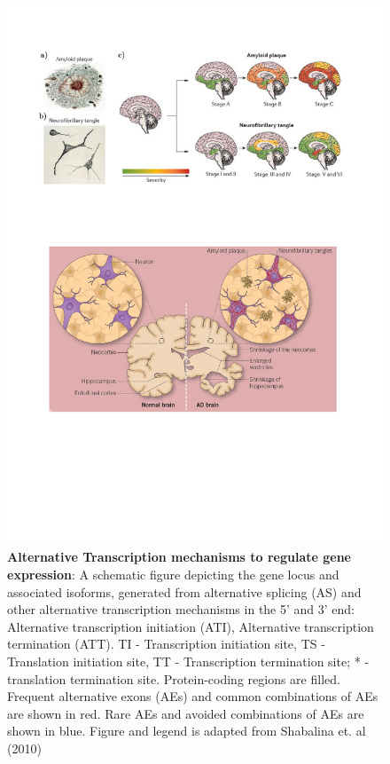 \begin{figure}[!h]
	\centering
	\includegraphics[page=14,trim={0 15cm 2cmcm 0},clip, scale = 0.7]{Figures/Introduction_Figures.pdf}
	\captionsetup{width=0.95\textwidth,singlelinecheck=off}
	\caption[Alternative transcription coupled with Alternative Splicing Mechanisms]%
	{\textbf{Alternative Transcription mechanisms to regulate gene expression}: A schematic figure depicting the gene locus and associated isoforms, generated from alternative splicing (AS) and other alternative transcription mechanisms in the 5' and 3' end: Alternative transcription initiation (ATI), Alternative transcription termination (ATT). \newline
	TI - Transcription initiation site, TS - Translation initiation site, TT - Transcription termination site; * - translation termination site. Protein-coding regions are filled. Frequent alternative exons (AEs) and common combinations of AEs are shown in red. Rare AEs and avoided combinations of AEs are shown in blue. Figure and legend is adapted from Shabalina et. al (2010)\cite{Shabalina2010}
	}
	\label{fig:AS_others}
\end{figure}

